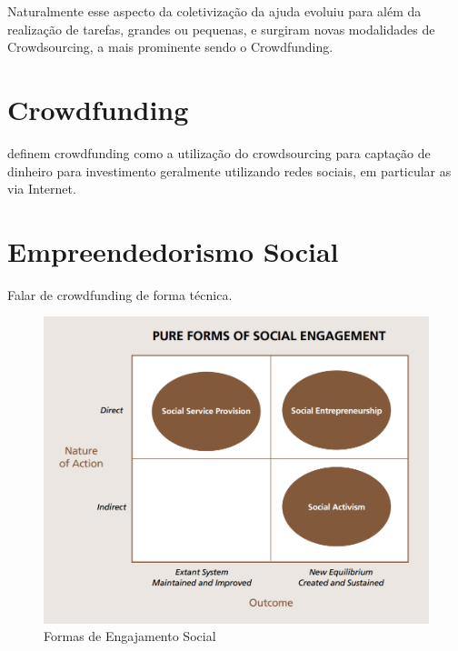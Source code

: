 Naturalmente esse aspecto da coletivização da ajuda evoluiu para além da realização de tarefas, grandes ou pequenas, e surgiram novas modalidades de Crowdsourcing, a mais prominente sendo o Crowdfunding.



\section{Crowdfunding}
\citeauthor{belleflamme2010} definem crowdfunding como a utilização do crowdsourcing para captação de dinheiro para investimento geralmente utilizando redes sociais, em particular as via Internet.




\section{Empreendedorismo Social}
Falar de crowdfunding de forma técnica.

\begin{figure}[H]
  \centering
  \includegraphics[scale=0.4]{imagens/formas-engajamento-social}
  \caption{Formas de Engajamento Social}
  \label{Rótulo da Imagem}
\end{figure}

